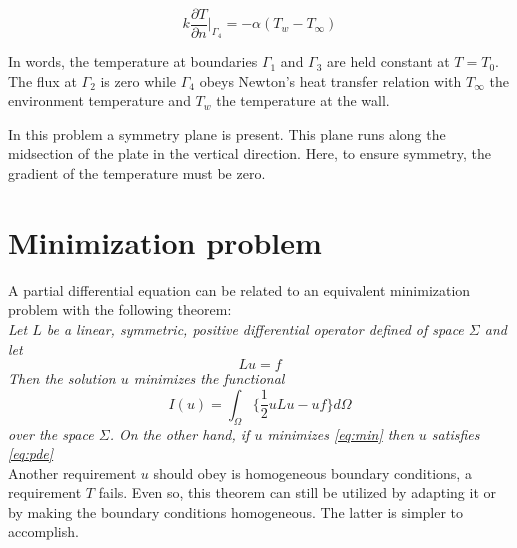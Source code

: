 \documentclass[10pt,a4paper]{article}
\begin{document}
\begin{equation}
k\frac{\partial T}{\partial n}|_{\Gamma_4}=-\alpha(T_w - T_{\infty})
\end{equation}

In words, the temperature at boundaries $\Gamma_1$ and $\Gamma_3$ are held constant at $T=T_0$. The flux at $\Gamma_2$ is zero while $\Gamma_4$ obeys Newton's heat transfer relation with $T_{\infty}$ the environment temperature and $T_w$ the temperature at the wall.

In this problem a symmetry plane is present. This plane runs along the midsection of the plate in the vertical direction. Here, to ensure symmetry, the gradient of the temperature must be zero.

\newpage

\section{Minimization problem}
A partial differential equation can be related to an equivalent minimization problem with the following theorem:\\

\textit{Let $L$ be a linear, symmetric, positive differential operator defined of space $\Sigma$ and let}
\begin{equation}\label{eq:pde}
Lu=f
\end{equation}
\textit{Then the solution $u$ minimizes the functional}
\begin{equation}\label{eq:min}
I(u) = \int _{\Omega}\{\frac{1}{2}uLu-uf\}d\Omega
\end{equation}  \textit{over the space $\Sigma$. On the other hand, if $u$ minimizes \eqref{eq:min} then $u$ satisfies \eqref{eq:pde}} \\

Another requirement $u$ should obey is homogeneous boundary conditions, a requirement $T$ fails. Even so, this theorem can still be utilized by adapting it or by making the boundary conditions homogeneous. The latter is simpler to accomplish.
\end{document}
